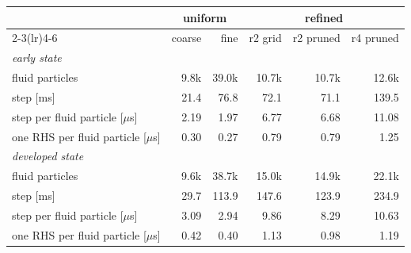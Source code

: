 \begin{tabular}{lrrrrr}
\toprule
 & \multicolumn{2}{c}{uniform} & \multicolumn{3}{c}{refined} \\
\cmidrule(lr){2-3}\cmidrule(lr){4-6}
 & coarse & fine & r2 grid & r2 pruned & r4 pruned \\
\midrule
\multicolumn{6}{l}{\emph{early state}} \\
\quad fluid particles & 9.8k & 39.0k & 10.7k & 10.7k & 12.6k \\
\quad step [ms] & 21.4 & 76.8 & 72.1 & 71.1 & 139.5 \\
\quad step per fluid particle [$\mu$s] & 2.19 & 1.97 & 6.77 & 6.68 & 11.08 \\
\quad one RHS per fluid particle [$\mu$s] & 0.30 & 0.27 & 0.79 & 0.79 & 1.25 \\
\multicolumn{6}{l}{\emph{developed state}} \\
\quad fluid particles & 9.6k & 38.7k & 15.0k & 14.9k & 22.1k \\
\quad step [ms] & 29.7 & 113.9 & 147.6 & 123.9 & 234.9 \\
\quad step per fluid particle [$\mu$s] & 3.09 & 2.94 & 9.86 & 8.29 & 10.63 \\
\quad one RHS per fluid particle [$\mu$s] & 0.42 & 0.40 & 1.13 & 0.98 & 1.19 \\
\bottomrule
\end{tabular}
